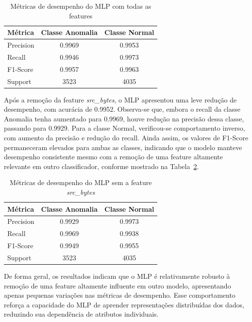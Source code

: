 \begin{table}[ht]
\centering
\caption{Métricas de desempenho do MLP com todas as features}
\label{tab:mlp_full}
\begin{tabular}{lcc}
\hline
\textbf{Métrica} & \textbf{Classe Anomalia} & \textbf{Classe Normal} \\
\hline
Precision & 0.9969 & 0.9953 \\
Recall    & 0.9946 & 0.9973 \\
F1-Score  & 0.9957 & 0.9963 \\
Support   & 3523   & 4035   \\
\hline
\end{tabular}
\end{table}

Após a remoção da feature \textit{src\_bytes}, o MLP apresentou uma leve redução de
desempenho, com acurácia de 0.9952. Observa-se que, embora o recall da classe Anomalia
tenha aumentado para 0.9969, houve redução na precisão dessa classe, passando para
0.9929. Para a classe Normal, verificou-se comportamento inverso, com aumento da
precisão e redução do recall. Ainda assim, os valores de F1-Score permaneceram elevados
para ambas as classes, indicando que o modelo manteve desempenho consistente mesmo com a
remoção de uma feature altamente relevante em outro classificador, conforme mostrado na
Tabela~\ref{tab:mlp_reduced}.

\begin{table}[ht]
\centering
\caption{Métricas de desempenho do MLP sem a feature \textit{src\_bytes}}
\label{tab:mlp_reduced}
\begin{tabular}{lcc}
\hline
\textbf{Métrica} & \textbf{Classe Anomalia} & \textbf{Classe Normal} \\
\hline
Precision & 0.9929 & 0.9973 \\
Recall    & 0.9969 & 0.9938 \\
F1-Score  & 0.9949 & 0.9955 \\
Support   & 3523   & 4035   \\
\hline
\end{tabular}
\end{table}

De forma geral, os resultados indicam que o MLP é relativamente robusto à remoção de uma
feature altamente influente em outro modelo, apresentando apenas pequenas variações nas
métricas de desempenho. Esse comportamento reforça a capacidade do MLP de aprender
representações distribuídas dos dados, reduzindo sua dependência de atributos
individuais.

